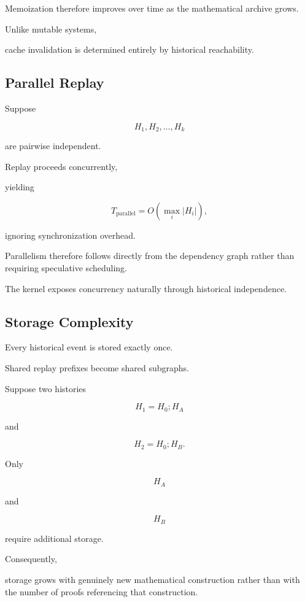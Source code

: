\documentclass[12pt,oneside]{article}
\theoremstyle{definition}
\theoremstyle{remark}
\begin{document}
Memoization therefore improves over time as the mathematical archive grows.

Unlike mutable systems,

cache invalidation is determined entirely by historical reachability.


\subsection{Parallel Replay}

Suppose

\[
H_1,
H_2,
\ldots,
H_k
\]

are pairwise independent.

Replay proceeds concurrently,

yielding

\[
T_{\mathrm{parallel}}
=
O
\left(
\max_i
|H_i|
\right),
\]

ignoring synchronization overhead.

Parallelism therefore follows directly from the dependency graph rather than
requiring speculative scheduling.

The kernel exposes concurrency naturally through historical independence.


\subsection{Storage Complexity}

Every historical event is stored exactly once.

Shared replay prefixes become shared subgraphs.

Suppose two histories

\[
H_1
=
H_0;
H_A
\]

and

\[
H_2
=
H_0;
H_B.
\]

Only

\[
H_A
\]

and

\[
H_B
\]

require additional storage.

Consequently,

storage grows with genuinely new mathematical construction rather than with the
number of proofs referencing that construction.
\end{document}
